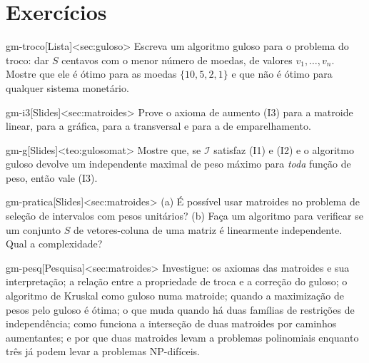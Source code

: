 \section{Exercícios}
\excurso
\begin{exercicio}{gm-troco}[Lista]<sec:guloso>
Escreva um algoritmo guloso para o problema do troco: dar $S$ centavos com o menor número de moedas, de valores $v_1,\dots,v_n$. Mostre que ele é ótimo para as moedas $\{10,5,2,1\}$ e que não é ótimo para qualquer sistema monetário.
\end{exercicio}
\begin{exercicio}{gm-i3}[Slides]<sec:matroides>
Prove o axioma de aumento (I3) para a matroide linear, para a gráfica, para a transversal e para a de emparelhamento.
\end{exercicio}
\begin{exercicio}{gm-g}[Slides]<teo:gulosomat>
Mostre que, se $\mathcal I$ satisfaz (I1) e (I2) e o algoritmo guloso devolve um independente maximal de peso máximo para \emph{toda} função de peso, então vale (I3).
\end{exercicio}
\begin{exercicio}{gm-pratica}[Slides]<sec:matroides>
(a) É possível usar matroides no problema de seleção de intervalos com pesos unitários? (b) Faça um algoritmo para verificar se um conjunto $S$ de vetores-coluna de uma matriz é linearmente independente. Qual a complexidade?
\end{exercicio}
\begin{exercicio}{gm-pesq}[Pesquisa]<sec:matroides>
Investigue: os axiomas das matroides e sua interpretação; a relação entre a propriedade de troca e a correção do guloso; o algoritmo de Kruskal como guloso numa matroide; quando a maximização de pesos pelo guloso é ótima; o que muda quando há duas famílias de restrições de independência; como funciona a interseção de duas matroides por caminhos aumentantes; e por que duas matroides levam a problemas polinomiais enquanto três já podem levar a problemas NP-difíceis.
\end{exercicio}

